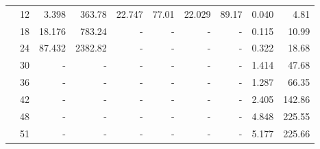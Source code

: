 \begin{figure}[h!]
\begin{tabular}{| r | r | r | r | r | r | r | r | r | r |}
		{} & 12 & 3.398 & 363.78 & 22.747 & 77.01 & 22.029 & 89.17 & 0.040 & 4.81  \\
		{} & 18 & 18.176 & 783.24 & - & - & - & - & 0.115 & 10.99  \\
		{} & 24 & 87.432 & 2382.82 & - & - & - & - & 0.322 & 18.68  \\
		{} & 30 & - & - & - & - & - & - & 1.414 & 47.68  \\
		{} & 36 & - & - & - & - & - & - & 1.287 & 66.35  \\
		{} & 42 & - & - & - & - & - & - & 2.405 & 142.86  \\
		{} & 48 & - & - & - & - & - & - & 4.848 & 225.55  \\
		{} & 51 & - & - & - & - & - & - & 5.177 & 225.66  \\
		\hline
	\end{tabular}
	\label{tabl:data:mutual}
\end{figure}


